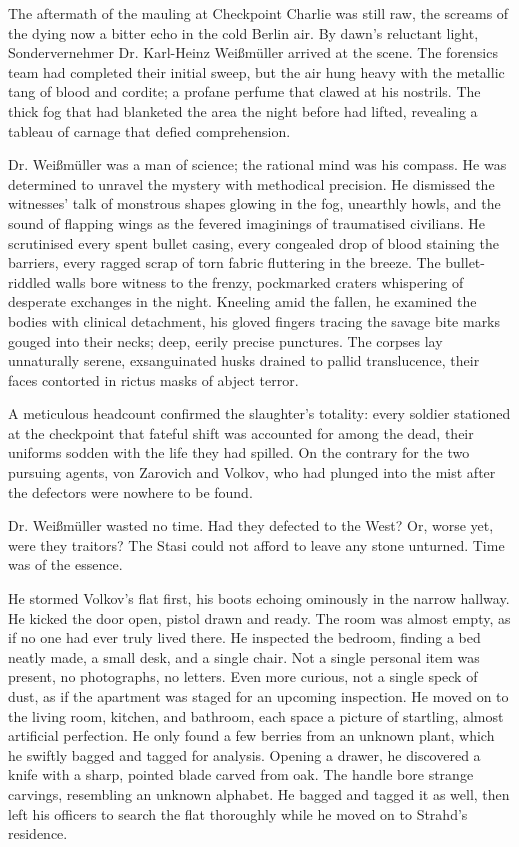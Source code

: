 \autoChapter

The aftermath of the mauling at Checkpoint Charlie was still raw, the screams of the dying now a bitter echo in the cold Berlin air.
By dawn's reluctant light, Sondervernehmer Dr. Karl-Heinz Weißmüller arrived at the scene.
The forensics team had completed their initial sweep, but the air hung heavy with the metallic tang of blood and cordite; a profane perfume that clawed at his nostrils.
The thick fog that had blanketed the area the night before had lifted, revealing a tableau of carnage that defied comprehension.

Dr. Weißmüller was a man of science; the rational mind was his compass.
He was determined to unravel the mystery with methodical precision.
He dismissed the witnesses' talk of monstrous shapes glowing in the fog, unearthly howls, and the sound of flapping wings as the fevered imaginings of traumatised civilians.
He scrutinised every spent bullet casing, every congealed drop of blood staining the barriers, every ragged scrap of torn fabric fluttering in the breeze.
The bullet-riddled walls bore witness to the frenzy, pockmarked craters whispering of desperate exchanges in the night.
Kneeling amid the fallen, he examined the bodies with clinical detachment, his gloved fingers tracing the savage bite marks gouged into their necks; deep, eerily precise punctures.
The corpses lay unnaturally serene, exsanguinated husks drained to pallid translucence, their faces contorted in rictus masks of abject terror.

A meticulous headcount confirmed the slaughter's totality: every soldier stationed at the checkpoint that fateful shift was accounted for among the dead, their uniforms sodden with the life they had spilled.
On the contrary for the two pursuing agents, von Zarovich and Volkov, who had plunged into the mist after the defectors were nowhere to be found.

Dr. Weißmüller wasted no time.
Had they defected to the West?
Or, worse yet, were they traitors?
The Stasi could not afford to leave any stone unturned.
Time was of the essence.

He stormed Volkov's flat first, his boots echoing ominously in the narrow hallway.
He kicked the door open, pistol drawn and ready.
The room was almost empty, as if no one had ever truly lived there.
He inspected the bedroom, finding a bed neatly made, a small desk, and a single chair.
Not a single personal item was present, no photographs, no letters.
Even more curious, not a single speck of dust, as if the apartment was staged for an upcoming inspection.
He moved on to the living room, kitchen, and bathroom, each space a picture of startling, almost artificial perfection.
He only found a few berries from an unknown plant, which he swiftly bagged and tagged for analysis.
Opening a drawer, he discovered a knife with a sharp, pointed blade carved from oak.
The handle bore strange carvings, resembling an unknown alphabet.
He bagged and tagged it as well, then left his officers to search the flat thoroughly while he moved on to Strahd's residence.

